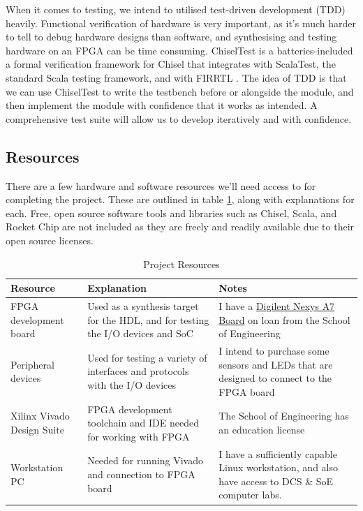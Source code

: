\documentclass[a4paper,fleqn,12pt]{article}
\begin{document}
When it comes to testing, we intend to utilised test-driven development (TDD) heavily. Functional verification of hardware is very important, as it's much harder to tell to debug hardware designs than software, and synthesising and testing hardware on an FPGA can be time consuming. ChiselTest is a batteries-included a formal verification framework for Chisel that integrates with ScalaTest, the standard Scala testing framework, and with FIRRTL \citep{chiselverification}. The idea of TDD is that we can use ChiselTest to write the testbench before or alongside the module, and then implement the module with confidence that it works as intended. A comprehensive test suite will allow us to develop iteratively and with confidence.


\subsection{Resources}
There are a few hardware and software resources we'll need access to for completing the project. These are outlined in table \ref{tab:resources}, along with explanations for each. Free, open source software tools and libraries such as Chisel, Scala, and Rocket Chip are not included as they are freely and readily available due to their open source licenses.

\begin{table}[h!]
	\centering
	\begin{tabular}{|p{}|p{}|p{}|}
		\hline
		\textbf{Resource}          & \textbf{Explanation}                                                            & \textbf{Notes}                                                                                                                                   \\ \hline
		FPGA development board     & Used as a synthesis target for the HDL, and for testing the I/O devices and SoC & I have a \href{https://digilent.com/reference/programmable-logic/nexys-a7/start}{Digilent Nexys A7 Board} on loan from the School of Engineering \\ \hline
		Peripheral devices         & Used for testing a variety of interfaces and protocols with the I/O devices     & I intend to purchase some sensors and LEDs that are designed to connect to the FPGA board                                                        \\ \hline
		Xilinx Vivado Design Suite & FPGA development toolchain and IDE needed for working with FPGA                 & The School of Engineering has an education license                                                                                               \\ \hline
		Workstation PC             & Needed for running Vivado and connection to FPGA board                          & I have a sufficiently capable Linux workstation, and also have access to DCS \& SoE computer labs.                                               \\ \hline
	\end{tabular}
	\caption{Project Resources}
	\label{tab:resources}
\end{table}
\end{document}
